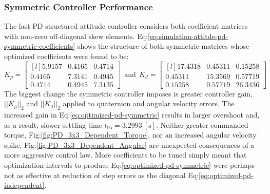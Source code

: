 \subsubsection{Symmetric Controller Performance}
\label{subsubsec:simulation.atttiude.pd.3x3}
The last PD structured attitude controller considers both coefficient matrices with non-zero off-diagonal skew elements. Eq:\ref{eq:simulation-attitde-pd-symmetric-coefficients} shows the structure of both symmetric matrices whose optimized coefficients were found to be:
\begin{equation}\label{eq:optimized-pd-symmetric}
K_p = \begin{bmatrix*}[l]
5.9157 & 0.4165 & 0.4714\\
0.4165 & 7.3141 & 0.4945\\
0.4714 & 0.4945 & 7.3135
\end{bmatrix*}
~~\text{and}~~K_d = \begin{bmatrix*}[l]
17.4318 & 0.45311 & 0.15258\\
0.45311 & 15.3569 & 0.57719\\
0.15258 & 0.57719 & 26.3436
\end{bmatrix*}
\end{equation}
The biggest change the symmetric controller imposes is greater controller gain, $||K_p||_2$ and $||K_d||_2$ applied to quaternion and angular velocity errors. The increased gain in Eq:\ref{eq:optimized-pd-symmetric} results in larger overshoot and, as a result, slower settling time $t_{95}=3.2993~[\text{s}]$. Neither greater commanded torque, Fig:\ref{fig:PD_3x3_Dependent_Torque}, nor an increased angular velocity spike, Fig:\ref{fig:PD_3x3_Dependent_Angular} are unexpected consequences of a more aggressive control law. More coefficients to be tuned simply meant that optimization intervals to produce Eq:\ref{eq:optimized-pd-symmetric} were perhaps not as effective at reduction of step errors as the diagonal Eq:\ref{eq:optimized-pd-independent}.
